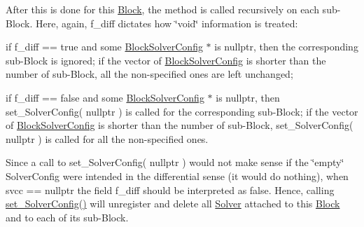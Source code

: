 After this is done for this \mbox{\hyperlink{class_s_m_spp__di__unipi__it_1_1_block}{Block}}, the method is called recursively on each sub-\/\+Block. Here, again, f\+\_\+diff dictates how \char`\"{}void\char`\"{} information is treated\+:


\begin{DoxyItemize}
\item if f\+\_\+diff == true and some \mbox{\hyperlink{class_s_m_spp__di__unipi__it_1_1_block_solver_config}{Block\+Solver\+Config}} $\ast$ is nullptr, then the corresponding sub-\/\+Block is ignored; if the vector of \mbox{\hyperlink{class_s_m_spp__di__unipi__it_1_1_block_solver_config}{Block\+Solver\+Config}} is shorter than the number of sub-\/\+Block, all the non-\/specified ones are left unchanged;
\item if f\+\_\+diff == false and some \mbox{\hyperlink{class_s_m_spp__di__unipi__it_1_1_block_solver_config}{Block\+Solver\+Config}} $\ast$ is nullptr, then set\+\_\+\+Solver\+Config( nullptr ) is called for the corresponding sub-\/\+Block; if the vector of \mbox{\hyperlink{class_s_m_spp__di__unipi__it_1_1_block_solver_config}{Block\+Solver\+Config}} is shorter than the number of sub-\/\+Block, set\+\_\+\+Solver\+Config( nullptr ) is called for all the non-\/specified ones.
\end{DoxyItemize}

Since a call to set\+\_\+\+Solver\+Config( nullptr ) would not make sense if the \char`\"{}empty\char`\"{} Solver\+Config were intended in the differential sense (it would do nothing), when svcc == nullptr the field f\+\_\+diff should be interpreted as false. Hence, calling \mbox{\hyperlink{class_s_m_spp__di__unipi__it_1_1_block_a40a2bbe11fbdf470e474f6638fefa66f}{set\+\_\+\+Solver\+Config()}} will unregister and delete all \mbox{\hyperlink{class_s_m_spp__di__unipi__it_1_1_solver}{Solver}} attached to this \mbox{\hyperlink{class_s_m_spp__di__unipi__it_1_1_block}{Block}} and to each of its sub-\/\+Block.

